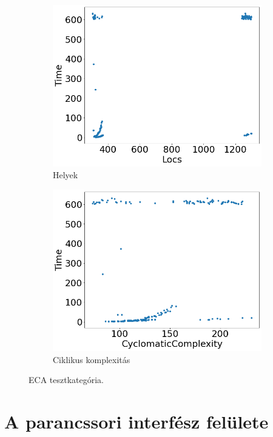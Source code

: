 \begin{figure}[ht]
\begin{subfigure}[b]{0.5\linewidth}
		\includegraphics[width=0.95\linewidth]{figures/eca/locs.png} 
		\caption{Helyek} 
	\end{subfigure}%
	\begin{subfigure}[b]{0.5\linewidth}
		\centering
		\includegraphics[width=0.95\linewidth]{figures/eca/cc.png} 
		\caption{Ciklikus komplexitás\label{fig_eca_cc} }
	\end{subfigure} 
	\caption{ECA tesztkategória.\label{fig_eca} }
\end{figure}

\clearpage


\section{A parancssori interfész felülete}
\label{sec:parancs_int_fel}

